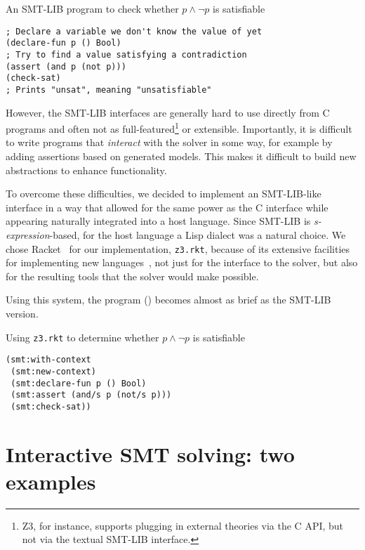 \begin{program}
\caption{An SMT-LIB program to check whether $p \wedge \neg p$ is satisfiable}
\label{fig:smtlib-prop}
\begin{verbatim}
; Declare a variable we don't know the value of yet
(declare-fun p () Bool)
; Try to find a value satisfying a contradiction
(assert (and p (not p)))
(check-sat)
; Prints "unsat", meaning "unsatisfiable"
\end{verbatim}
\end{program}

However, the SMT-LIB interfaces are generally hard to use directly from C
programs and often not as full-featured\footnote{Z3, for instance, supports
plugging in external theories via the C API, but not via the textual SMT-LIB
interface.}  or extensible. Importantly, it is difficult to write programs
that \textit{interact} with the solver in some way, for example by adding
assertions based on generated models. This makes it difficult to build new
abstractions to enhance functionality.

To overcome these difficulties, we decided to implement an SMT-LIB-like
interface in a way that allowed for the same power as the C interface while
appearing naturally integrated into a host language. Since SMT-LIB is {\em
s-expression}-based, for the host language a Lisp dialect was a natural
choice. We chose Racket~\cite{racket} for our implementation, \texttt{z3.rkt},
because of its extensive facilities for implementing new languages~\cite
{Tobin-Hochstadt:11}, not just for the interface to the solver, but also for
the resulting tools that the solver would make possible.

Using this system, the program () becomes almost as brief
as the SMT-LIB version.

\begin{program}
\caption{Using \texttt{z3.rkt} to determine whether $p \wedge \neg p$ is satisfiable}
\label{fig:rkt-prop}
\begin{verbatim}
(smt:with-context
 (smt:new-context)
 (smt:declare-fun p () Bool)
 (smt:assert (and/s p (not/s p)))
 (smt:check-sat))
\end{verbatim}
\end{program}

\section{Interactive SMT solving: two examples}
\label{sec:interactive}

